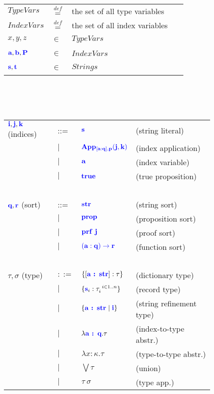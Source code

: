 \documentclass[sigplan,10pt,review,anonymous]{acmart}
\newcommand{\blu}[1]{\textbf{\color{blue}{#1}}}
\newcommand{\blum}[1]{\mathbf{\color{blue}{#1}}}
\newcommand{\defeq}{\overset{\mathit{def}}{=}}
\begin{document}
\begin{figure}
\begin{tabular}{llll}
$\mathit{TypeVars}$ & $\defeq$ & the set of all type variables \\
$\mathit{IndexVars}$ & $\defeq$ & the set of all index variables \\
$x,y,z$ & $\in$ & $\mathit{TypeVars}$ & ~ \\
$\blu{a}, \blu{b}, \blu{P}$ & $\in$ & $\mathit{IndexVars}$ & ~ \\
$\blu{s},\blu{t}$ & $\in$ & $\mathit{Strings}$ & ~ \\
\end{tabular}\\~\\~\\
\begin{tabular}{llll}
$\blu{i},\blu{j},\blu{k}$ (indices) & ::=  & $\blum{s}$ & (string literal) \\
                          & $\mid$ & $\blum{App}_{\blum{[a : q],p}}\blum{(j,k)}$ & (index application) \\
                          & $\mid$ & $\blu{a}$ & (index variable) \\
                          & $\mid$ & $\blu{true}$ & (true proposition) \\
~ & ~ & ~ & ~ \\
$\blu{q},\blu{r}$ (sort) & ::= & $\blum{str}$ & (string sort) \\
                         & $\mid$ & $\blum{prop}$ & (proposition sort) \\
                         & $\mid$ & $\blum{prf~j}$ & (proof sort) \\
                         & $\mid$ & $\blum{(a : q) \to r}$ & (function sort) \\
~ & ~ & ~ & ~ \\
$\tau,\sigma$ (type) & $::=$ & $\{[\blu{a : str}] : \tau \}$ & (dictionary type) \\ 
       & $\mid$ & $\{ \blu{s}_i : \tau_i^{~i \in 1..n} \}$ & (record type) \\
       & $\mid$ & $\{ \blu{a : str} \mid \blu{i} \}$ & (string refinement type) \\
       & $\mid$ & $\lambda \blu{a : q} . \tau$ & (index-to-type abstr.) \\
       & $\mid$ & $\lambda x : \kappa. \tau$ & (type-to-type abstr.) \\
       & $\mid$ & $\bigvee \tau$ & (union) \\
       & $\mid$ & $\tau~\sigma$ & (type app.) \\

\end{tabular}
\end{figure}
\end{document}
